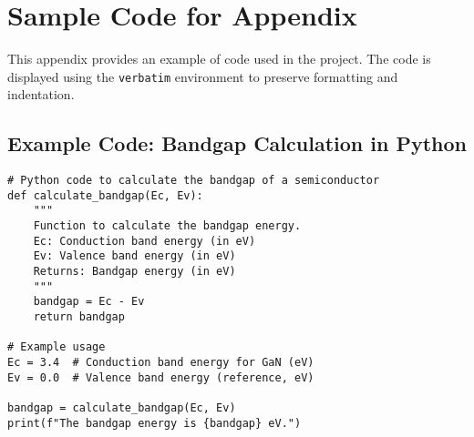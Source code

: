 \chapter{Sample Code for Appendix}


This appendix provides an example of code used in the project. The code is displayed using the \texttt{verbatim} environment to preserve formatting and indentation.

\section{Example Code: Bandgap Calculation in Python}

\begin{verbatim}
# Python code to calculate the bandgap of a semiconductor
def calculate_bandgap(Ec, Ev):
    """
    Function to calculate the bandgap energy.
    Ec: Conduction band energy (in eV)
    Ev: Valence band energy (in eV)
    Returns: Bandgap energy (in eV)
    """
    bandgap = Ec - Ev
    return bandgap

# Example usage
Ec = 3.4  # Conduction band energy for GaN (eV)
Ev = 0.0  # Valence band energy (reference, eV)

bandgap = calculate_bandgap(Ec, Ev)
print(f"The bandgap energy is {bandgap} eV.")
\end{verbatim}
